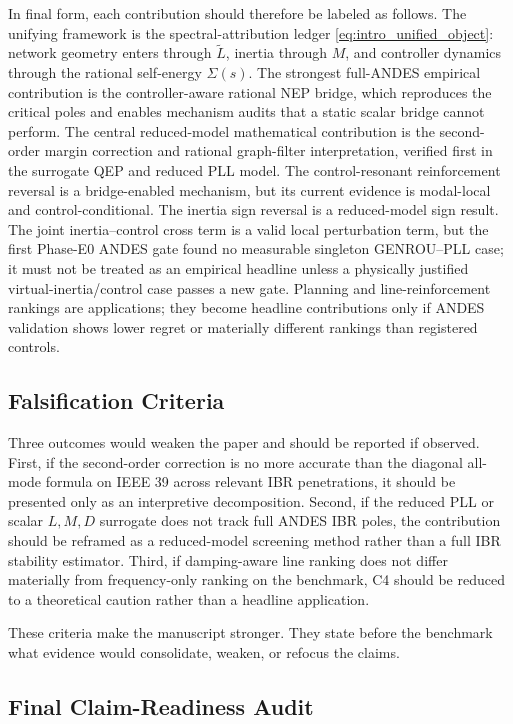 \documentclass[journal]{IEEEtran}
\newcommand{\Lt}{\widetilde L}
\begin{document}
In final form, each contribution should therefore be labeled as follows. The unifying framework is the spectral-attribution ledger \eqref{eq:intro_unified_object}: network geometry enters through $\Lt$, inertia through $M$, and controller dynamics through the rational self-energy $\Sigma(s)$. The strongest full-ANDES empirical contribution is the controller-aware rational NEP bridge, which reproduces the critical poles and enables mechanism audits that a static scalar bridge cannot perform. The central reduced-model mathematical contribution is the second-order margin correction and rational graph-filter interpretation, verified first in the surrogate QEP and reduced PLL model. The control-resonant reinforcement reversal is a bridge-enabled mechanism, but its current evidence is modal-local and control-conditional. The inertia sign reversal is a reduced-model sign result. The joint inertia--control cross term is a valid local perturbation term, but the first Phase-E0 ANDES gate found no measurable singleton GENROU--PLL case; it must not be treated as an empirical headline unless a physically justified virtual-inertia/control case passes a new gate. Planning and line-reinforcement rankings are applications; they become headline contributions only if ANDES validation shows lower regret or materially different rankings than registered controls.

\subsection{Falsification Criteria}

Three outcomes would weaken the paper and should be reported if observed. First, if the second-order correction is no more accurate than the diagonal all-mode formula on IEEE 39 across relevant IBR penetrations, it should be presented only as an interpretive decomposition. Second, if the reduced PLL or scalar $L,M,D$ surrogate does not track full ANDES IBR poles, the contribution should be reframed as a reduced-model screening method rather than a full IBR stability estimator. Third, if damping-aware line ranking does not differ materially from frequency-only ranking on the benchmark, C4 should be reduced to a theoretical caution rather than a headline application.

These criteria make the manuscript stronger. They state before the benchmark what evidence would consolidate, weaken, or refocus the claims.

\subsection{Final Claim-Readiness Audit}
\end{document}
